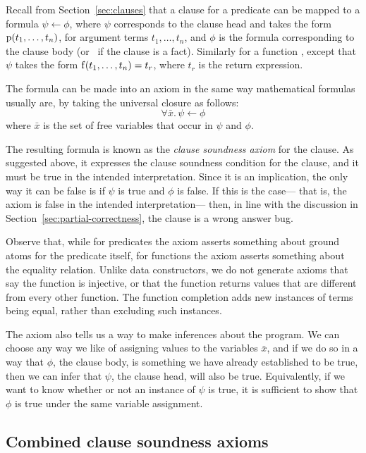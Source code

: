 Recall from Section~\ref{sec:clauses}
that a clause for a predicate 
can be mapped to a formula $\psi \leftarrow \phi$,
where $\psi$ corresponds to the clause head
and takes the form $\operatorname{p}(t_1, \ldots, t_n)$,
for argument terms $t_1, \ldots, t_n$,
and $\phi$ is the formula corresponding to the clause body
(or \true\ if the clause is a fact).
Similarly for a function ,
except that $\psi$ takes the form $\operatorname{f}(t_1, \ldots, t_n) = t_r$,
where $t_r$ is the return expression.

The formula can be made into an axiom
in the same way mathematical formulas usually are,
by taking the universal closure as follows:
\[ \forall \bar{x}.\, \psi \leftarrow \phi \]
where $\bar{x}$ is the set of free variables
that occur in $\psi$ and $\phi$.

The resulting formula is known as
the \emph{clause soundness axiom}
for the clause.
As suggested above,
it expresses the clause soundness condition for the clause,
and it must be true in the intended interpretation.
Since it is an implication,
the only way it can be false
is if $\psi$ is true and $\phi$ is false.
If this is the case---%
that is, the axiom is false in the intended interpretation---%
then, in line with the discussion in Section~\ref{sec:partial-correctness},
the clause is a wrong answer bug.

Observe that,
while for predicates the axiom asserts
something about ground atoms for the predicate itself,
for functions the axiom asserts
something about the equality relation.
Unlike data constructors,
we do not generate axioms that say
the function is injective,
or that the function returns values
that are different from every other function.
The function completion adds new instances of terms being equal,
rather than excluding such instances.

The axiom also tells us a way to make inferences about the program.
We can choose any way we like
of assigning values to the variables $\bar{x}$,
and if we do so in a way that $\phi$, the clause body,
is something we have already established to be true,
then we can infer that $\psi$, the clause head,
will also be true.
Equivalently,
if we want to know whether or not an instance of $\psi$ is true,
it is sufficient to show that $\phi$ is true
under the same variable assignment.


\subsection{Combined clause soundness axioms}
\label{sec:ax-combined}

